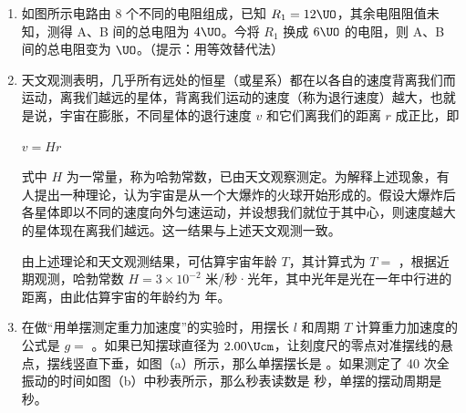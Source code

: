 \documentclass[\gkver]{gaokaozhenti}
\begin{document}
\begin{enumerate}
\item
如图所示电路由 8 个不同的电阻组成，已知 $R_{1} = 12\UO$，其余电阻阻值未知，测得 A、B 间的总电阻为 $4\UO$。今将 $R_{1}$ 换成 $6\UO$ 的电阻，则 A、B 间的总电阻变为  $\UO$。（提示：用等效替代法）
\onepicture[align=right, w=3.65cm]{}

\item
天文观测表明，几乎所有远处的恒星（或星系）都在以各自的速度背离我们而运动，离我们越远的星体，背离我们运动的速度（称为退行速度）越大，也就是说，宇宙在膨胀，不同星体的退行速度 $v$ 和它们离我们的距离 $r$ 成正比，即

$v = Hr$

式中 $H$ 为一常量，称为哈勃常数，已由天文观察测定。为解释上述现象，有人提出一种理论，认为宇宙是从一个大爆炸的火球开始形成的。假设大爆炸后各星体即以不同的速度向外匀速运动，并设想我们就位于其中心，则速度越大的星体现在离我们越远。这一结果与上述天文观测一致。

由上述理论和天文观测结果，可估算宇宙年龄 $T$，其计算式为 $T =$ ，根据近期观测，哈勃常数 $H = 3\times10^{-2}$ 米/秒·光年，其中光年是光在一年中行进的距离，由此估算宇宙的年龄约为  年。

\item
在做“用单摆测定重力加速度”的实验时，用摆长 $l$ 和周期 $T$ 计算重力加速度的公式是 $g =$ 。如果已知摆球直径为 $2.00\Ucm$，让刻度尺的零点对准摆线的悬点，摆线竖直下垂，如图（a）所示，那么单摆摆长是 。如果测定了 40 次全振动的时间如图（b）中秒表所示，那么秒表读数是  秒，单摆的摆动周期是  秒。


\end{enumerate}
\end{document}
